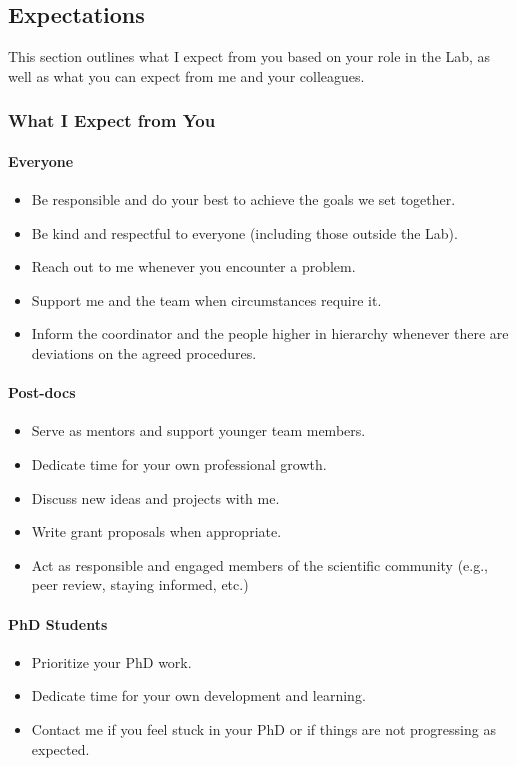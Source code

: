 \documentclass[12pt]{article}
\begin{document}
\subsection{Expectations}
This section outlines what I expect from you based on your role in the Lab, as well as what you can expect from me and your colleagues.
\subsubsection{What I Expect from You}

\paragraph{Everyone}
\begin{itemize}
\item Be responsible and do your best to achieve the goals we set together.
\item Be kind and respectful to everyone (including those outside the Lab).
\item Reach out to me whenever you encounter a problem.
\item Support me and the team when circumstances require it.
\item Inform the coordinator and the people higher in hierarchy whenever there are deviations on the agreed procedures. 
\end{itemize}

\paragraph{Post-docs}
\begin{itemize}
\item Serve as mentors and support younger team members.
\item Dedicate time for your own professional growth.
\item Discuss new ideas and projects with me.
\item Write grant proposals when appropriate.
\item Act as responsible and engaged members of the scientific community (e.g., peer review, staying informed, etc.)
\end{itemize}

\paragraph{PhD Students}
\begin{itemize}
\item Prioritize your PhD work.
\item Dedicate time for your own development and learning.
\item Contact me if you feel stuck in your PhD or if things are not progressing as expected.
\end{itemize}
\end{document}
